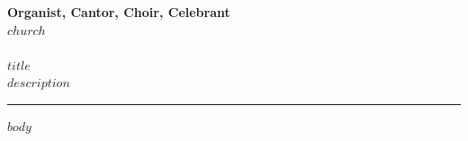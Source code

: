 \documentclass[12pt]{extarticle}
\newcommand{\cross}{\textcolor{schedred}{\CrossMaltese}}
\begin{document}
{%
\centering
\textbf{\Large Organist, Cantor, Choir, Celebrant} \\[0.2em]
\textbf{\large $church$} \\[0.6em]
{\Large \cross} \\[0.5em]
{\large \textcolor{schedred}{\textbf{$title$}}} \\[0.3em]
\textcolor{schedred}{\textbf{$description$}} \\[2em]
\hrule \vspace{1em}
\par
}

\vspace{0.5em}

$body$
\end{document}
